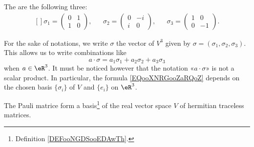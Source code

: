\begin{definition}      \label{DEFooRNTDooTVkPtB}
    The  are the following three:
    \begin{equation}
        \begin{aligned}[]
            \sigma_1=\begin{pmatrix}
                0    &   1    \\ 
                1    &   0    
            \end{pmatrix},&&
            \sigma_2=\begin{pmatrix}
                0    &   -i    \\ 
                i    &   0    
            \end{pmatrix},&&
            \sigma_3=\begin{pmatrix}
                1    &   0    \\ 
                0    &   -1    
            \end{pmatrix}.
        \end{aligned}
    \end{equation}
\end{definition}

For the sake of notations, we write \( \sigma\) the vector of \( V^3\) given by \( \sigma=(\sigma_1, \sigma_2, \sigma_3)\). This allows us to write combinations like
\begin{equation}        \label{EQooXNRGooZaRQoZ}
    a\cdot \sigma=a_1\sigma_1+a_2\sigma_2+a_3\sigma_3
\end{equation}
when \( a\in \eR^3\). It must be noticed however that the notation «\( a\cdot \sigma\)» is not a scalar product. In particular, the formula \eqref{EQooXNRGooZaRQoZ} depends on the chosen basis \( \{ \sigma_i \}\) of \( V\) and \( \{ e_i \}\) on \( \eR^3\).

\begin{lemma}       \label{LEMooZNCQooLgoReX}
    The Pauli matrice form a basis\footnote{Definition \ref{DEFooNGDSooEDAwTh}.} of the real vector space \( V\) of hermitian traceless matrices.
\end{lemma}

